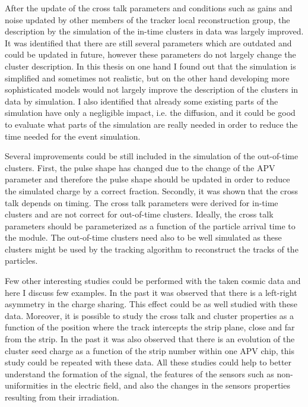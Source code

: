 After the update of the cross talk parameters and conditions such as gains and noise updated by other members of the tracker local reconstruction group, the description by the simulation of the in-time clusters in data was largely improved. It was identified that there are still several parameters which are outdated and could be  updated in future, however these parameters do not largely change the cluster description. In this thesis on one hand I found out that the simulation is simplified and sometimes not realistic, but on the other hand developing more sophisticated models would not largely improve the description of the clusters in data by simulation. I also identified that already some existing parts of the simulation have only a negligible impact, i.e. the diffusion, and it could be good to evaluate what parts of the simulation are really needed in order to reduce the time needed for the event simulation.

Several improvements could be still included in the simulation of the out-of-time clusters. First, the pulse shape has changed due to the change of the APV parameter and therefore the pulse shape should be updated in order to reduce the simulated charge by a correct fraction. Secondly, it was shown that the cross talk depends on timing. The cross talk parameters were derived for in-time clusters and are not correct for out-of-time clusters. Ideally, the cross talk parameters should be parameterized as a function of the particle arrival time to the module. The out-of-time clusters need also to be well simulated as these clusters might be used by the tracking algorithm to reconstruct the tracks of the particles.

Few other interesting studies could be performed with the taken cosmic data and here I discuss few examples. In the past it was observed that there is a left-right asymmetry in the charge sharing. This effect could be as well studied with these data. Moreover, it is possible to study the cross talk and cluster properties as a function of the position where the track intercepts the strip plane, close and far from the strip. In the past it was also observed that there is an evolution of the cluster seed charge as a function of the strip number within one APV chip, this study could be repeated with these data. All these studies could help to better understand the formation of the signal, the features of the sensors such as non-uniformities in the electric field, and also the changes in the sensors properties resulting from their irradiation. 


